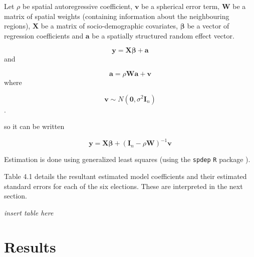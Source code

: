 \documentclass[openany]{book}
\begin{document}
Let \(\rho\) be spatial autoregressive coefficient, \(\boldsymbol v\) be a spherical error term, \({\boldsymbol W}\) be a matrix of spatial weights (containing information about the neighbouring regions), \(\boldsymbol X\) be a matrix of socio-demographic covariates, \(\boldsymbol \beta\) be a vector of regression coefficients and \(\boldsymbol a\) be a spatially structured random effect vector.

\[{\boldsymbol y} = {\boldsymbol X} {\boldsymbol \beta} + {\boldsymbol a}\]
and

\[{\boldsymbol a} = \rho {\boldsymbol W} {\boldsymbol a} + {\boldsymbol v}\]
where

\[{\boldsymbol v} \sim N({\boldsymbol 0}, \sigma^2 {\boldsymbol I_n})\].

so it can be written

\[{\boldsymbol y} = {\boldsymbol X} {\boldsymbol \beta} + ({\boldsymbol I}_n-\rho {\boldsymbol W})^{-1}{\boldsymbol v}\]

Estimation is done using generalized least squares (using the \texttt{spdep} \texttt{R} package \citep{spdep}).

Table 4.1 details the resultant estimated model coefficients and their estimated standard errors for each of the six elections. These are interpreted in the next section.

\emph{insert table here}

\hypertarget{results}{%
\chapter{Results}\label{results}}


\end{document}
